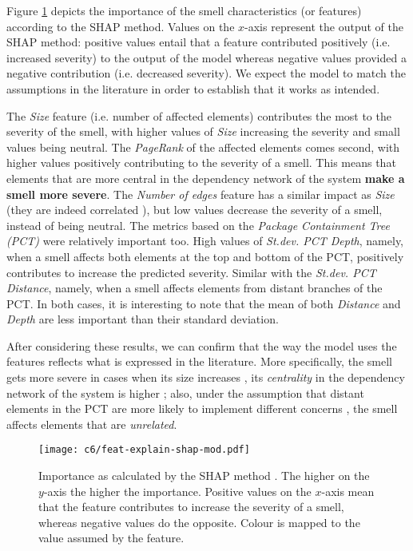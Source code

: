 Figure \ref{c6:fig:feat-explain-shap} depicts the importance of the smell characteristics (or features) according to the SHAP method. Values on the $x$-axis represent the output of the SHAP method: positive values entail that a feature contributed positively (i.e. increased severity) to the output of the model whereas negative values provided a negative contribution (i.e. decreased severity).
We expect the model to match the assumptions in the literature in order to establish that it works as intended.

The \emph{Size} feature (i.e. number of affected elements) contributes the most to the severity of the smell, with higher values of \emph{Size} increasing the severity and small values being neutral.
The \emph{PageRank} of the affected elements comes second, with higher values positively contributing to the severity of a smell.
This means that elements that are more central in the dependency network of the system \textbf{make a smell more severe}.
The \emph{Number of edges} feature has a similar impact as \emph{Size} (they are indeed correlated \cite{Sas2019}), but low values decrease the severity of a smell, instead of being neutral.
The metrics based on the \emph{Package Containment Tree (PCT)} \cite{Laval2012,AlMutawa2014} were relatively important too.
High values of \emph{St.dev. PCT Depth}, namely, when a smell affects both elements at the top and bottom of the PCT, positively contributes to increase the predicted severity.
Similar with the \emph{St.dev. PCT Distance}, namely, when a smell affects elements from distant branches of the PCT.
In both cases, it is interesting to note that the mean of both \emph{Distance} and \emph{Depth} are less important than their standard deviation.

After considering these results, we can confirm that the way the model uses the features reflects what is expressed in the literature.
More specifically, the smell gets more severe in cases when its size increases \cite{Lippert2006}, its \emph{centrality} in the dependency network of the system is higher \cite{Roveda2018}; also, under the assumption that distant elements in the PCT are more likely to implement different concerns \cite{Laval2012}, the smell affects elements that are  \emph{unrelated}.

\begin{figure}
    \centering
    \texttt{[image: c6/feat-explain-shap-mod.pdf]}
    \caption{Importance as calculated by the SHAP method \cite{Strumbelj2014}. The higher on the $y$-axis the higher the importance.  Positive values on the $x$-axis mean that the feature contributes to increase the severity of a smell, whereas negative values do the opposite. Colour is mapped to the value assumed by the feature.} 
    \label{c6:fig:feat-explain-shap}
\end{figure}


